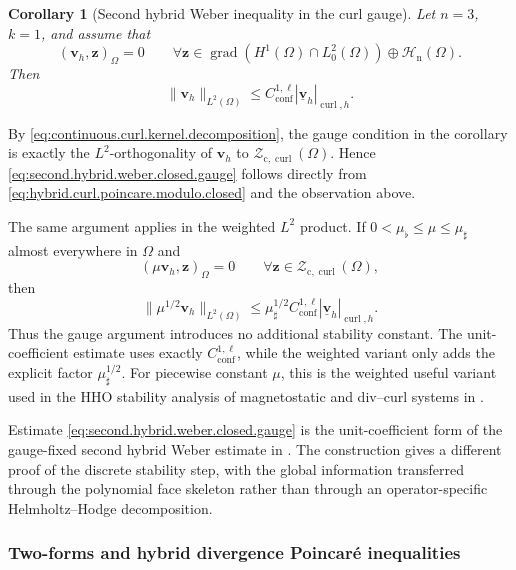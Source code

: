 \documentclass[a4paper,11pt]{article}
\newtheorem{corollary}[theorem]{Corollary}
\theoremstyle{definition}
\begin{document}
\begin{corollary}[Second hybrid Weber inequality in the curl gauge]
\label{cor:second.hybrid.weber.closed.gauge}
Let $n=3$, $k=1$, and assume that
\[
  \left(
    \boldsymbol v_h,
    \boldsymbol z
  \right)_\Omega
  =
  0
  \qquad
  \forall
  \boldsymbol z
  \in
  \operatorname{grad}
  \left(
    H^1(\Omega)\cap L_0^2(\Omega)
  \right)
  \oplus
  \boldsymbol{\mathcal H}_{\mathrm n}(\Omega).
\]
Then
\begin{equation}
\label{eq:second.hybrid.weber.closed.gauge}
  \|\boldsymbol v_h\|_{L^2(\Omega)}
  \leq
  C_{\mathrm{conf}}^{1,\ell}
  |\underline{\boldsymbol v}_h|_{\operatorname{curl},h}.
\end{equation}
\end{corollary}

By \eqref{eq:continuous.curl.kernel.decomposition}, the gauge condition in the corollary is exactly the $L^2$-orthogonality of $\boldsymbol v_h$ to $\boldsymbol{\mathcal Z}_{\mathrm c,\operatorname{curl}}(\Omega)$.
Hence \eqref{eq:second.hybrid.weber.closed.gauge} follows directly from \eqref{eq:hybrid.curl.poincare.modulo.closed} and the observation above.

The same argument applies in the weighted $L^2$ product.
If $0<\mu_{\flat}\leq\mu\leq\mu_{\sharp}$ almost everywhere in $\Omega$ and
\[
  (\mu\boldsymbol v_h,\boldsymbol z)_\Omega=0
  \qquad
  \forall\boldsymbol z\in
  \boldsymbol{\mathcal Z}_{\mathrm c,\operatorname{curl}}(\Omega),
\]
then
\[
  \|\mu^{1/2}\boldsymbol v_h\|_{L^2(\Omega)}
  \leq
  \mu_{\sharp}^{1/2}
  C_{\mathrm{conf}}^{1,\ell}
  |\underline{\boldsymbol v}_h|_{\operatorname{curl},h}.
\]
Thus the gauge argument introduces no additional stability constant.
The unit-coefficient estimate uses exactly $C_{\mathrm{conf}}^{1,\ell}$, while the weighted variant only adds the explicit factor $\mu_{\sharp}^{1/2}$.
For piecewise constant $\mu$, this is the weighted useful variant used in the HHO stability analysis of magnetostatic and div--curl systems in \cite{Lemaire.Pitassi:25,Dalphin.Ducreux.Lemaire.Pitassi:25}.

Estimate \eqref{eq:second.hybrid.weber.closed.gauge} is the unit-coefficient form of the gauge-fixed second hybrid Weber estimate in \cite[Remark~16]{Lemaire.Pitassi:25}.
The construction gives a different proof of the discrete stability step, with the global information transferred through the polynomial face skeleton rather than through an operator-specific Helmholtz--Hodge decomposition.

\subsubsection{Two-forms and hybrid divergence Poincar\'e inequalities}
\label{subsec:poincare.proxy.divergence}
\end{document}
